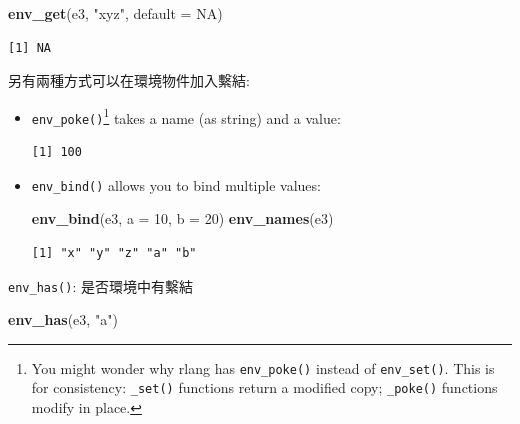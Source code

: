 \documentclass[]{book}
\newenvironment{Shaded}{\begin{snugshade}}{\end{snugshade}}
\newcommand{\DataTypeTok}[1]{\textcolor[rgb]{0.13,0.29,0.53}{#1}}
\newcommand{\DecValTok}[1]{\textcolor[rgb]{0.00,0.00,0.81}{#1}}
\newcommand{\KeywordTok}[1]{\textcolor[rgb]{0.13,0.29,0.53}{\textbf{#1}}}
\newcommand{\NormalTok}[1]{#1}
\newcommand{\OperatorTok}[1]{\textcolor[rgb]{0.81,0.36,0.00}{\textbf{#1}}}
\newcommand{\OtherTok}[1]{\textcolor[rgb]{0.56,0.35,0.01}{#1}}
\newcommand{\StringTok}[1]{\textcolor[rgb]{0.31,0.60,0.02}{#1}}
\let\rmarkdownfootnote\footnote%
\def\footnote{\protect\rmarkdownfootnote}
\theoremstyle{definition}
\theoremstyle{definition}
\theoremstyle{definition}
\theoremstyle{remark}
\begin{document}
\begin{Shaded}
\begin{Highlighting}[]
\KeywordTok{env_get}\NormalTok{(e3, }\StringTok{"xyz"}\NormalTok{, }\DataTypeTok{default =} \OtherTok{NA}\NormalTok{)}
\end{Highlighting}
\end{Shaded}

\begin{verbatim}
[1] NA
\end{verbatim}

另有兩種方式可以在環境物件加入繫結:

\begin{itemize}
\item
  \texttt{env\_poke()}\footnote{You might wonder why rlang has
    \texttt{env\_poke()} instead of \texttt{env\_set()}. This is for
    consistency: \texttt{\_set()} functions return a modified copy;
    \texttt{\_poke()} functions modify in place.} takes a name (as
  string) and a value:

\begin{Shaded}
\end{Shaded}

\begin{verbatim}
[1] 100
\end{verbatim}
\item
  \texttt{env\_bind()} allows you to bind multiple values:

\begin{Shaded}
\begin{Highlighting}[]
\KeywordTok{env_bind}\NormalTok{(e3, }\DataTypeTok{a =} \DecValTok{10}\NormalTok{, }\DataTypeTok{b =} \DecValTok{20}\NormalTok{)}
\KeywordTok{env_names}\NormalTok{(e3)}
\end{Highlighting}
\end{Shaded}

\begin{verbatim}
[1] "x" "y" "z" "a" "b"
\end{verbatim}
\end{itemize}

\texttt{env\_has()}: 是否環境中有繫結

\begin{Shaded}
\begin{Highlighting}[]
\KeywordTok{env_has}\NormalTok{(e3, }\StringTok{"a"}\NormalTok{)}
\end{Highlighting}
\end{Shaded}
\end{document}
